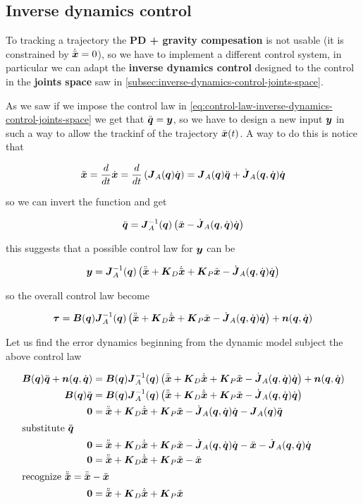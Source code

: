 \subsection{Inverse dynamics control}

To tracking a trajectory the \textbf{PD + gravity compesation} is not usable (it is constrained by $\dxd = 0$), so we have to implement a different control system, in particular we can adapt the \textbf{inverse dynamics control} designed to the control in the \textbf{joints space} saw in \autoref{subsec:inverse-dynamics-control-joints-space}.

As we saw if we impose the control law in \autoref{eq:control-law-inverse-dynamics-control-joints-space} we get that $\ddq = \y$, so we have to design a new input $\y$ in such a way to allow the trackinf of the trajectory $\xd(t)$.
A way to do this is notice that

\[
	\ddx = \frac{d}{dt} \dx = \frac{d}{dt} \left( \J_A(\q)\dq \right) = \J_A(\q)\ddq + \dJ_A(\q,\dq)\dq
\]

so we can invert the function and get

\[
	\ddq = \J_A^\inv(\q) \left(\ddx - \dJ_A(\q,\dq)\dq\right)
\]

this suggests that a possible control law for $\y$ can be

\begin{equation}
    \y = \J_A^\inv(\q) \left( \ddxd + \K_D\dxe + \K_P \xe - \dJ_A(\q,\dq)\dq \right)\label{eq:control-law-inverse-dynamics-operational-space}
\end{equation}

so the overall control law become

\[
	\vect\tau = \B(\q) \J_A^\inv(\q) \left( \ddxd + \K_D\dxe + \K_P \xe - \dJ_A(\q,\dq)\dq \right) + \vect n(\q,\dq)
\]

Let us find the error dynamics beginning from the dynamic model subject the above control law

\begin{align*}
    \matr{B}(\q)\ddq + \vect n(\q,\dq) &= \B(\q) \J_A^\inv(\q) \left( \ddxd + \K_D\dxe + \K_P \xe - \dJ_A(\q,\dq)\dq \right) + \vect n(\q,\dq) \\
    \matr{B}(\q)\ddq &= \B(\q) \J_A^\inv(\q) \left( \ddxd + \K_D\dxe + \K_P \xe - \dJ_A(\q,\dq)\dq \right) \\
    \0 &= \ddxd + \K_D\dxe + \K_P \xe - \dJ_A(\q,\dq)\dq - \J_A(\q) \ddq \\
    \intertext{substitute $\ddq$}
    \0 &= \ddxd + \K_D\dxe + \K_P \xe - \dJ_A(\q,\dq)\dq - \ddx - \dJ_A(\q,\dq)\dq \\
    \0 &= \ddxd + \K_D\dxe + \K_P \xe - \ddx \\
    \intertext{recognize $\ddxe = \ddxd - \ddx$}
    \0 &= \ddxe + \K_D\dxe + \K_P \xe \\
\end{align*}

